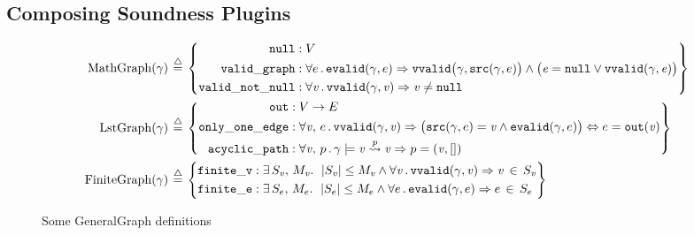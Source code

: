 \documentclass[acmsmall,screen]{acmart}
\newcommand{\defeq}{\mathbin{\stackrel{\triangle}{=}}}
\begin{document}
\subsection{Composing Soundness Plugins}
\label{subsec:graphplugins}
\begin{figure}
{\footnotesize
\begin{align*}
  \mathrm{MathGraph}(\gamma)\,& \defeq \,\left\{
  \begin{aligned}
    \mathtt{null}:&\; V\\
    \mathtt{valid\_graph}:&\;
    \forall e\,.\,\mathtt{evalid}(\gamma, e) \Rightarrow
      \mathtt{vvalid}\big(\gamma, \mathtt{src}(\gamma, e)\big)\wedge
      \big(\m{e} = \mathtt{null} \vee \mathtt{vvalid}(\gamma, \m{e})\big)\\
    \mathtt{valid\_not\_null}:&\; \forall \m{v}\,.\,\mathtt{vvalid}(\gamma, \m{v})
    \Rightarrow \m{v} \neq \mathtt{null}
  \end{aligned} \right\}\\
  \mathrm{LstGraph}(\gamma)\,&\defeq\, \left\{
  \begin{aligned}
    \mathtt{out}:&\; V \rightarrow E\\
    \mathtt{only\_one\_edge}:&\;
    \forall \m{v},\,e\,.\,\mathtt{vvalid}(\gamma, \m{v}) \Rightarrow
    \big(\mathtt{src}(\gamma, e) =\m{v} \wedge
    \mathtt{evalid}(\gamma, e)\big) \Leftrightarrow e = \mathtt{out}(\m{v})\\    
  \mathtt{acyclic\_path}:&\; \forall \m{v},\,p\,.\,
  \gamma |= \m{v} \overset{p}{\leadsto} \m{v} \Rightarrow p = (\m{v},[]) \\
  \end{aligned} \right\}\\
  \mathrm{FiniteGraph}(\gamma)\,&\defeq\, \left\{
  \begin{aligned}
      \mathtt{finite\_v}:&\;\exists\, S_\m{v},\, M_\m{v}.~\;\lvert S_\m{v}\rvert
      \leq M_\m{v} \wedge
      \forall \m{v}\,.\, \mathtt{vvalid}(\gamma,\m{v})\Rightarrow \m{v}\,\in\,S_\m{v}\\
      \mathtt{finite\_e}:&\;\exists\, S_e,\, M_e.~\;\lvert S_e\rvert
      \leq M_e \wedge
      \forall e\,.\, \mathtt{evalid}(\gamma,e)\Rightarrow e\,\in\,S_e\\
  \end{aligned}  \right\}\\
\end{align*}}
\vspace*{-3em}
\caption{Some GeneralGraph definitions}
\label{fig:gengraphdefs}
\vspace{-1.5em}

\end{figure} 
 
\end{document}
